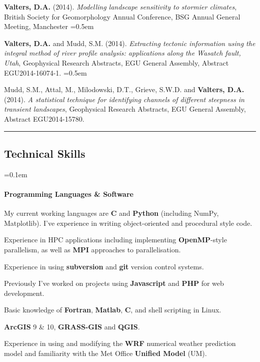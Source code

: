 \documentclass[10.5pt,a4]{article}
\newcommand{\CPP}
{C\nolinebreak[4]\hspace{-.05em}\raisebox{.22ex}{\footnotesize\bf ++}}
\begin{document}
\begin{itemize}

\end{itemize}


\hrule
\vspace{-0.4em}
\subsection*{Technical Skills}
	\parskip=0.1em
	\paragraph*{Programming Languages \& Software}
		\begin{itemize*}
		\item My current working languages are {\textbf{\CPP}} and \textbf{Python} (including NumPy, Matplotlib). I've experience in writing object-oriented and procedural style code. 
		\item Experience in HPC applications including implementing \textbf{OpenMP}-style parallelism, as well as \textbf{MPI} approaches to parallelisation. 
		\item Experience in using \textbf{subversion} and \textbf{git} version control systems. 
		\item Previously I've worked on projects using \textbf{Javascript} and \textbf{PHP} for web development. 
		\item Basic knowledge of \textbf{Fortran}, \textbf{Matlab}, \textbf{C}, and shell scripting in Linux. 
	\item  \textbf{ArcGIS} 9 \& 10, \textbf{GRASS-GIS} and \textbf{QGIS}. 
	\item Experience in using and modifying the \textbf{WRF} numerical weather prediction model and familiarity with the Met Office \textbf{Unified Model} (UM).
	\end{itemize*}
\end{document}
